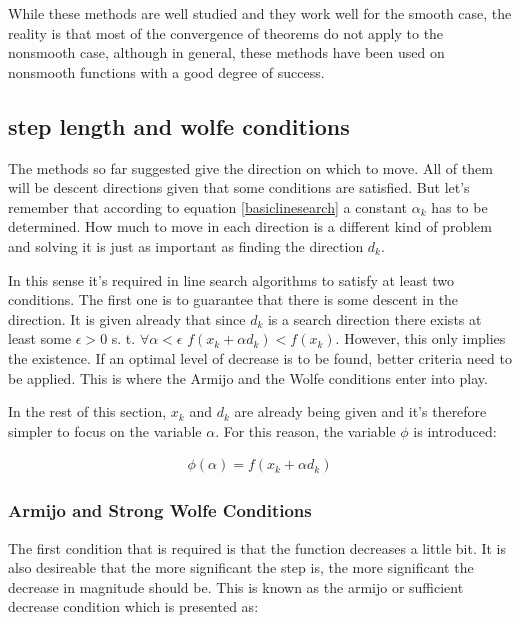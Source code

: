 While these methods are well studied and they work well for the smooth case, the reality is that most of the convergence of theorems do not apply to the nonsmooth case, although in general, these methods have been used on nonsmooth functions with a good degree of success\citep{skaaja}.

\subsection{step length and wolfe conditions}

The methods so far suggested give the direction on which to move. All of them will be descent directions given that some conditions are satisfied. But let's remember that according to equation \ref{basiclinesearch} a constant $\alpha_k$ has to be determined. How much to move in each direction is a different kind of problem and solving it is just as important as finding the direction $d_k$.

In this sense it's required in line search algorithms to satisfy at least two conditions. The first one is to guarantee that there is some descent in the direction. It is given already that since $d_k$ is a search direction there exists at least some $\epsilon > 0$ s. t. $\forall \alpha < \epsilon$ $f(x_k + \alpha d_k) < f(x_k)$. However, this only implies the existence. If an optimal level of decrease is to be found, better criteria need to be applied. This is where the Armijo and the Wolfe conditions enter into play.

In the rest of this section, $x_k$ and $d_k$ are already being given and it's therefore simpler to focus on the variable $\alpha$. For this reason, the variable $\phi$ is introduced:

\begin{equation}
  \begin{aligned}
    \phi(\alpha) = f(x_k + \alpha d_k)
  \end{aligned}
\end{equation}

\subsubsection{Armijo and Strong Wolfe Conditions}

The first condition that is required is that the function decreases a little bit. It is also desireable that the more significant the step is, the more significant the decrease in magnitude should be. This is known as the armijo or sufficient decrease condition which is presented as:

